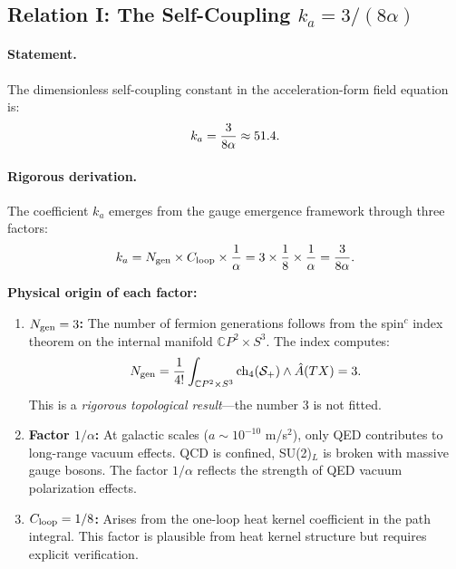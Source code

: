 \subsection{Relation I: The Self-Coupling $k_a = 3/(8\alpha)$}\label{sec:alpha-ka}

\paragraph{Statement.}
The dimensionless self-coupling constant in the acceleration-form field equation is:
\begin{equation}\label{eq:ka-relation}
k_a = \frac{3}{8\alpha} \approx 51.4.
\end{equation}

\paragraph{Rigorous derivation.}
The coefficient $k_a$ emerges from the gauge emergence framework through three factors:
\begin{equation}
k_a = N_{\rm gen} \times C_{\rm loop} \times \frac{1}{\alpha} = 3 \times \frac{1}{8} \times \frac{1}{\alpha} = \frac{3}{8\alpha}.
\end{equation}

\textbf{Physical origin of each factor:}
\begin{enumerate}
\item \textbf{$N_{\rm gen} = 3$:} The number of fermion generations follows from the spin$^c$ index theorem on the internal manifold $\mathbb{C}P^2 \times S^3$. The index computes:
\begin{equation}
N_{\rm gen} = \frac{1}{4!}\int_{\mathbb{C}P^2 \times S^3} \text{ch}_4(\mathcal{S}_+) \wedge \hat{A}(TX) = 3.
\end{equation}
This is a \textit{rigorous topological result}---the number 3 is not fitted.

\item \textbf{Factor $1/\alpha$:} At galactic scales ($a \sim 10^{-10}$ m/s$^2$), only QED contributes to long-range vacuum effects. QCD is confined, SU(2)$_L$ is broken with massive gauge bosons. The factor $1/\alpha$ reflects the strength of QED vacuum polarization effects.

\item \textbf{$C_{\rm loop} = 1/8$:} Arises from the one-loop heat kernel coefficient in the path integral. This factor is plausible from heat kernel structure but requires explicit verification.
\end{enumerate}

